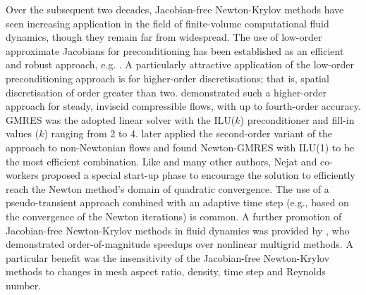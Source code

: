 \documentclass[sn-mathphys,Numbered]{sn-jnl}%
\begin{document}
Over the subsequent two decades, Jacobian-free Newton-Krylov methods have seen increasing application in the field of finite-volume computational fluid dynamics, though they remain far from widespread.
The use of low-order approximate Jacobians for preconditioning has been established as an efficient and robust approach, e.g. \citep{Nejat2008, Vaassen2008, Nejat2011, Nishikawa2020}.
A particularly attractive application of the low-order preconditioning approach is for higher-order discretisations; that is, spatial discretisation of order greater than two.
\citet{Nejat2008} demonstrated such a higher-order approach for steady, inviscid compressible flows, with up to fourth-order accuracy.
GMRES was the adopted linear solver with the ILU($k$) preconditioner and fill-in values ($k$) ranging from 2 to 4. 
\citet{Nejat2011} later applied the second-order variant of the approach to non-Newtonian flows and found Newton-GMRES with ILU(1) to be the most efficient combination.
Like \citet{Vaassen2008} and many other authors, Nejat and co-workers \citep{Nejat2008, Nejat2011} proposed a special start-up phase to encourage the solution to efficiently reach the Newton method's domain of quadratic convergence.
The use of a pseudo-transient approach combined with an adaptive time step (e.g., based on the convergence of the Newton iterations) is common.
A further promotion of Jacobian-free Newton-Krylov methods in fluid dynamics was provided by \citet{Lucas2010}, who demonstrated order-of-magnitude speedups over nonlinear multigrid methods.
A particular benefit was the insensitivity of the Jacobian-free Newton-Krylov methods to changes in mesh aspect ratio, density, time step and Reynolds number.
\end{document}
